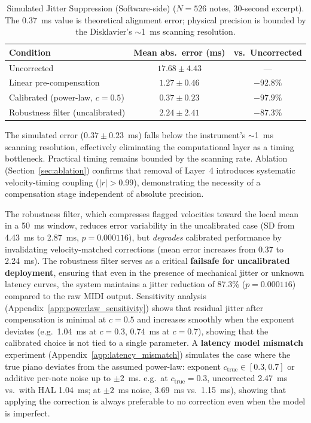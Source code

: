 \documentclass[a4paper]{article}
\newcommand{\tbl}[2]{\caption{#1}\centering#2}
\theoremstyle{definition}
\theoremstyle{remark}
\begin{document}
\begin{table}[htbp]
\tbl{Simulated Jitter Suppression (Software-side) ($N = 526$ notes, 30-second excerpt). The 0.37~ms value is theoretical alignment error; physical precision is bounded by the Disklavier's ${\sim}$1~ms scanning resolution.}
{%
\begin{tabular}{@{}lcc@{}} \toprule
\textbf{Condition} & \textbf{Mean abs.\ error (ms)} & \textbf{vs.\ Uncorrected} \\ \midrule
Uncorrected & $17.68 \pm 4.43$ & --- \\
Linear pre-compensation & $1.27 \pm 0.46$ & $-92.8\%$ \\
Calibrated (power-law, $c=0.5$) & $0.37 \pm 0.23$ & $-97.9\%$ \\ \midrule
Robustness filter (uncalibrated) & $2.24 \pm 2.41$ & $-87.3\%$ \\ \bottomrule
\end{tabular}%
}
\label{tab:calibration}
\end{table}

The simulated error ($0.37 \pm 0.23$~ms) falls below the instrument's ${\sim}$1~ms scanning resolution, effectively eliminating the computational layer as a timing bottleneck. Practical timing remains bounded by the scanning rate. Ablation (Section~\ref{sec:ablation}) confirms that removal of Layer~4 introduces systematic velocity-timing coupling ($|r| > 0.99$), demonstrating the necessity of a compensation stage independent of absolute precision.

The robustness filter, which compresses flagged velocities toward the local mean in a 50~ms window, reduces error variability in the uncalibrated case (SD from 4.43~ms to 2.87~ms, $p = 0.000116$), but \emph{degrades} calibrated performance by invalidating velocity-matched corrections (mean error increases from 0.37 to 2.24~ms). The robustness filter serves as a critical \textbf{failsafe for uncalibrated deployment}, ensuring that even in the presence of mechanical jitter or unknown latency curves, the system maintains a jitter reduction of 87.3\% ($p = 0.000116$) compared to the raw MIDI output. Sensitivity analysis (Appendix~\ref{app:powerlaw_sensitivity}) shows that residual jitter after compensation is minimal at $c = 0.5$ and increases smoothly when the exponent deviates (e.g.\ 1.04~ms at $c = 0.3$, 0.74~ms at $c = 0.7$), showing that the calibrated choice is not tied to a single parameter. A \textbf{latency model mismatch} experiment (Appendix~\ref{app:latency_mismatch}) simulates the case where the true piano deviates from the assumed power-law: exponent $c_{\mathrm{true}} \in [0.3, 0.7]$ or additive per-note noise up to $\pm 2$~ms. e.g.\ at $c_{\mathrm{true}} = 0.3$, uncorrected 2.47~ms vs.\ with HAL 1.04~ms; at $\pm 2$~ms noise, 3.69~ms vs.\ 1.15~ms), showing that applying the correction is always preferable to no correction even when the model is imperfect.
\end{document}
